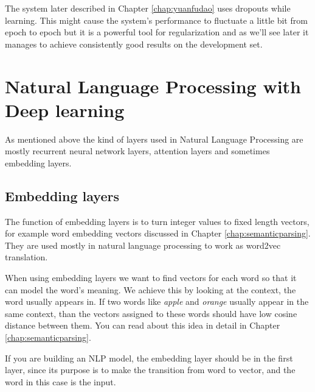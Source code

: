 The system later described in Chapter \ref{chap:yuanfudao} uses dropouts while learning. This might cause the system's performance to fluctuate a little bit from epoch to epoch but it is a powerful tool for regularization and as we'll see later it manages to achieve consistently good results on the development set.

\section{Natural Language Processing with Deep learning}
As mentioned above the kind of layers used in Natural Language Processing are mostly recurrent neural network layers, attention layers and sometimes embedding layers.

\subsection{Embedding layers}

The function of embedding layers is to turn integer values to fixed length vectors, for example word embedding vectors discussed in Chapter \ref{chap:semanticparsing}. They are used mostly in natural language processing to work as word2vec translation.

When using embedding layers we want to find vectors for each word so that it can model the word's meaning. We achieve this by looking at the context, the word usually appears in. If two words like \textit{apple} and \textit{orange} usually appear in the same context, than the vectors assigned to these words should have low cosine distance between them. You can read about this idea in detail in Chapter \ref{chap:semanticparsing}.

If you are building an NLP model, the embedding layer should be in the first layer, since its purpose is to make the transition from word to vector, and the word in this case is the input.

